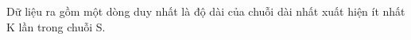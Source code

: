 Dữ liệu ra gồm một dòng duy nhất là độ dài của chuỗi dài nhất xuất hiện ít nhất K lần trong chuỗi S.